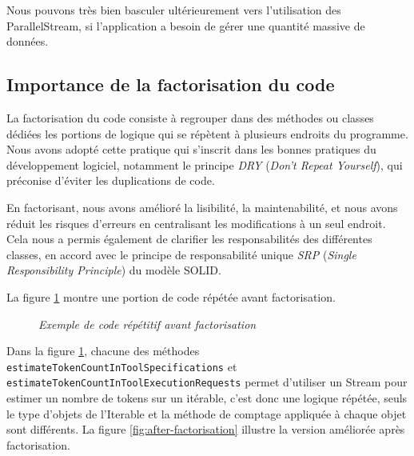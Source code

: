 \documentclass[12pt,a4paper]{report}
\begin{document}
	Nous pouvons très bien basculer ultérieurement vers l'utilisation des ParallelStream, si l'application a besoin de gérer une quantité massive de données.
	
	\subsection{Importance de la factorisation du code}
	
	La factorisation du code consiste à regrouper dans des méthodes ou classes dédiées les portions de logique qui se répètent à plusieurs endroits du programme. Nous avons adopté cette pratique qui s'inscrit dans les bonnes pratiques du développement logiciel, notamment le principe \textit{DRY} (\textit{Don't Repeat Yourself}), qui préconise d'éviter les duplications de code.
	
	En factorisant, nous avons amélioré la lisibilité, la maintenabilité, et nous avons réduit les risques d'erreurs en centralisant les modifications à un seul endroit. Cela nous a permis également de clarifier les responsabilités des différentes classes, en accord avec le principe de responsabilité unique \textit{SRP} (\textit{Single Responsibility Principle}) du modèle SOLID.
	
	La figure \ref{fig:before-factorisation} montre une portion de code répétée avant factorisation.
	
	\begin{figure}[H]
		\centering
		\caption{\textit{Exemple de code répétitif avant factorisation}}
		\label{fig:before-factorisation}
	\end{figure}
	
	Dans la figure \ref{fig:before-factorisation}, chacune des méthodes \verb|estimateTokenCountInToolSpecifications| et \verb|estimateTokenCountInToolExecutionRequests| permet d'utiliser un Stream pour estimer un nombre de tokens sur un itérable, c'est donc une logique répétée, seuls le type d'objets de l'Iterable et la méthode de comptage appliquée à chaque objet sont différents. La figure \ref{fig:after-factorisation} illustre la version améliorée après factorisation.
	
\end{document}
